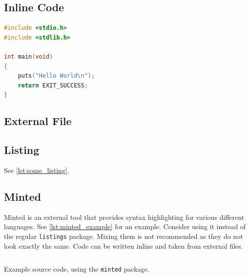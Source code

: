 \subsection{Inline Code}

\begin{lstlisting}[language=c]
#include <stdio.h>
#include <stdlib.h>

int main(void)
{
	puts("Hello World\n");
	return EXIT_SUCCESS;
}
\end{lstlisting}

\subsection{External File}



\subsection{Listing}

See \cref{lst:some_listing}.



\subsection{Minted}

Minted is an external tool that provides syntax highlighting for various different languages.
See \cref{lst:minted_example} for an example.
Consider using it instead of the regular \texttt{listings} package.
Mixing them is not recommended as they do not look exactly the same.
Code can be written inline and taken from external files.

\begin{listing}
	\inputminted{haskell}{code/sample.hs}
	\caption{Example source code, using the \texttt{minted} package.}
	\label{lst:minted_example}
\end{listing}
